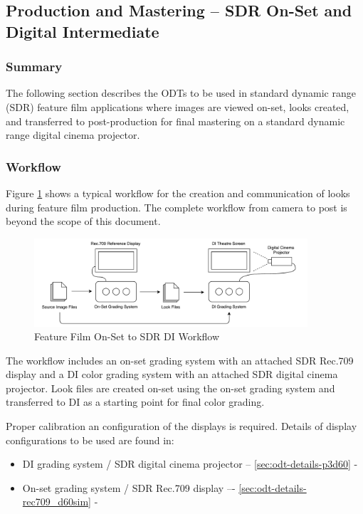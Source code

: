 \subsection{Production and Mastering -- SDR On-Set and Digital Intermediate} \label{subsec:ff-onset-di-sdr}

	\subsubsection{Summary}
	The following section describes the ODTs to be used in standard dynamic range (SDR) feature film applications where images are viewed on-set, looks created, and transferred to post-production for final mastering on a standard dynamic range digital cinema projector.
	
	\subsubsection{Workflow}
	Figure \ref{fig:workflow1} shows a typical workflow for the creation and communication of looks during feature film production.  The complete workflow from camera to post is beyond the scope of this document. 
	
	\begin{figure}[ht!]
	\centering
	    \includegraphics[width=4in]{images/workflows/workflow_ff-sdr-on-set-di.pdf}
	    \caption{\small Feature Film On-Set to SDR DI Workflow}
	    \label{fig:workflow1}
	\end{figure}
	
	The workflow includes an on-set grading system with an attached SDR Rec.709 display and a DI color grading system with an attached SDR digital cinema projector.  Look files are created on-set using the on-set grading system and transferred to DI as a starting point for final color grading.
	
	Proper calibration an configuration of the displays is required.  Details of display configurations to be used are found in:
	
		\begin{itemize}
		  	\item DI grading system / SDR digital cinema projector -- \autoref{sec:odt-details-p3d60} - 
  			\item On-set grading system / SDR Rec.709 display –- \autoref{sec:odt-details-rec709_d60sim} - 
		\end{itemize}
		
